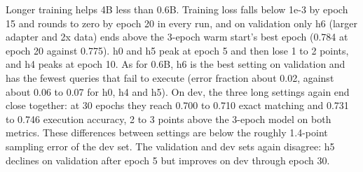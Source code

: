 Longer training helps 4B less than 0.6B. Training loss falls below 1e-3 by epoch 15 and rounds to zero by epoch 20 in every run, and on validation only h6 (larger adapter and 2x data) ends above the 3-epoch warm start's best epoch (0.784 at epoch 20 against 0.775). h0 and h5 peak at epoch 5 and then lose 1 to 2 points, and h4 peaks at epoch 10. As for 0.6B, h6 is the best setting on validation and has the fewest queries that fail to execute (error fraction about 0.02, against about 0.06 to 0.07 for h0, h4 and h5). On dev, the three long settings again end close together: at 30 epochs they reach 0.700 to 0.710 exact matching and 0.731 to 0.746 execution accuracy, 2 to 3 points above the 3-epoch model on both metrics. These differences between settings are below the roughly 1.4-point sampling error of the dev set. The validation and dev sets again disagree: h5 declines on validation after epoch 5 but improves on dev through epoch 30.


